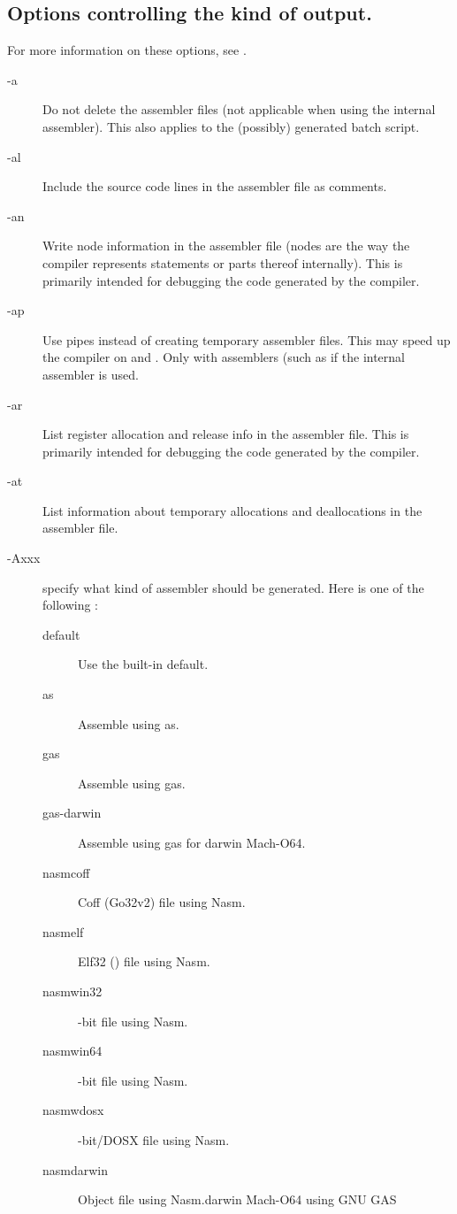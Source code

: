 \subsection{Options controlling the kind of output.}
\label{se:codegen}
For more information on these options, see \progref.
\begin{description}
\item [-a]  Do not delete the assembler files (not
applicable when using the internal assembler). This also applies
to the (possibly) generated batch script.
\item [-al]  Include the source code lines in the assembler
file as comments.
\item[-an]  Write node information in the
assembler file (nodes are the way the compiler represents statements or parts
thereof internally). This is primarily intended for debugging
the code generated by the compiler.
\item[-ap]  Use pipes instead of creating temporary assembler
files.  This may speed up the compiler on \ostwo and \linux. 
Only with assemblers (such as \gnu %
if the internal assembler is used.
\item[-ar]  List register allocation and
release info in the assembler file. This is primarily intended for debugging
the code generated by the compiler.
\item[-at]  List information about
temporary allocations and deallocations in the assembler file.
\item [-Axxx]  specify what kind of assembler should be generated. 
Here  is one of the following :
\begin{description}
\item[default] Use the built-in default.
\item[as] Assemble using \gnu as.
\item[gas] Assemble using \gnu gas.
\item[gas-darwin] Assemble using \gnu gas for darwin Mach-O64.
\item[nasmcoff] Coff (Go32v2) file using Nasm.
\item[nasmelf] Elf32 (\linux) file using Nasm.
\item[nasmwin32] -bit file using Nasm.
\item[nasmwin64] -bit file using Nasm.
\item[nasmwdosx] -bit/DOSX file using Nasm.
\item[nasmdarwin] Object file using Nasm.darwin Mach-O64 using GNU GAS 

\end{description}
\end{description}
